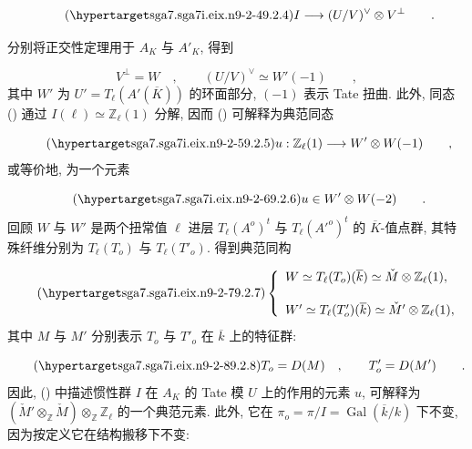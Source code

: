 \begin{equation}\tag{\SGARefTarget{sga7.sga7i.eix.n9-2-4}{9.2.4}}
I\longrightarrow (U/V)^{\vee}\otimes V^{\perp} \qquad .
\end{equation}

分别将正交性定理用于 $A_K$ 与 $A'_K$, 得到

\begin{equation*}
V^{\perp}=W \quad , \qquad
(U/V)^{\vee}\simeq W'(-1) \qquad ,
\end{equation*}
其中 $W'$ 为 $U'=T_{\ell}(A'(\overline K))$ 的环面部分, $(-1)$ 表示 Tate 扭曲. 此外, 同态 () 通过 $I(\ell)\simeq\mathbb{Z}_{\ell}(1)$ 分解, 因而 () 可解释为典范同态

\begin{equation}\tag{\SGARefTarget{sga7.sga7i.eix.n9-2-5}{9.2.5}}
u:\mathbb{Z}_{\ell}(1)\longrightarrow W'\otimes W(-1)
 \qquad ,
\end{equation}
或等价地, 为一个元素

\begin{equation}\tag{\SGARefTarget{sga7.sga7i.eix.n9-2-6}{9.2.6}}
u\in W'\otimes W(-2) \qquad .
\end{equation}
回顾 $W$ 与 $W'$ 是两个扭常值 $\ell$ 进层 $T_{\ell}(A^o)^t$ 与 $T_{\ell}({A'}^o)^t$ 的 $\overline K$-值点群, 其特殊纤维分别为 $T_{\ell}(T_o)$ 与 $T_{\ell}(T'_o)$. 得到典范同构

\begin{equation}\tag{\SGARefTarget{sga7.sga7i.eix.n9-2-7}{9.2.7}}
\left\{
\begin{array}{l}
W\simeq T_{\ell}(T_o)(\overline k)
 \simeq\check M\otimes\mathbb{Z}_{\ell}(1),\\[3ex]
W'\simeq T_{\ell}(T'_o)(\overline k)
 \simeq\check M'\otimes\mathbb{Z}_{\ell}(1),
\end{array}
\right.
\end{equation}
其中 $M$ 与 $M'$ 分别表示 $T_o$ 与 $T'_o$ 在 $\overline k$ 上的特征群:

\begin{equation}\tag{\SGARefTarget{sga7.sga7i.eix.n9-2-8}{9.2.8}}
T_o=D(M) \quad , \qquad T'_o=D(M') \qquad .
\end{equation}
因此, () 中描述惯性群 $I$ 在 $A_K$ 的 Tate 模 $U$ 上的作用的元素 $u$, 可解释为 $(\check M'\otimes_{\mathbb{Z}}\check M)
 \otimes_{\mathbb{Z}}\mathbb{Z}_{\ell}$ 的一个典范元素. 此外, 它在 $\pi_o=\pi/I=\operatorname{Gal}(\overline k/k)$ 下不变, 因为按定义它在结构搬移下不变:

